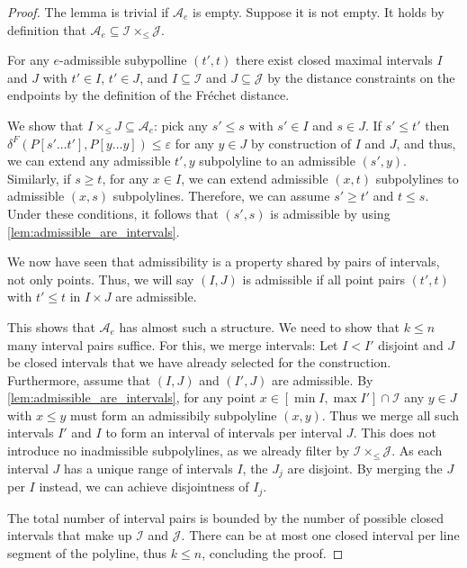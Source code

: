 \begin{proof}
	The lemma is trivial if \(\mathcal{A}_e\) is empty. Suppose it is not empty. It holds by definition that \(\mathcal{A}_e \subseteq \mathcal{I} \times_\leq \mathcal{J}\). 

	For any \(e\)-admissible subypolline \((t', t)\) there exist closed maximal intervals \(I\) and \(J\) with \(t' \in I\), \(t' \in J\), and \(I \subseteq \mathcal{I}\) and \(J \subseteq \mathcal{J}\) by the distance constraints on the endpoints by the definition of the Fréchet distance. 

	We show that \(I \times_\leq J \subseteq \mathcal{A}_e\): pick any \(s' \leq s\) with \(s' \in I\) and \(s \in J\). If \(s' \leq t'\) then \(\delta^F(P[s' \dots t'], P[y \dots y]) \leq \varepsilon\) for any \(y \in J\) by construction of \(I\) and \(J\), and thus, we can extend any admissible \(t', y\) subpolyline to an admissible \((s', y)\). Similarly, if \(s \geq t\), for any \(x \in I\), we can extend admissible \((x, t)\) subpolylines to admissible \((x, s)\) subpolylines. Therefore, we can assume \(s' \geq t'\) and \(t \leq s\). Under these conditions, it follows that \((s', s)\) is admissible by using \cref{lem:admissible_are_intervals}.

	We now have seen that admissibility is a property shared by pairs of intervals, not only points. Thus, we will say \((I, J)\) is admissible if all point pairs \((t', t)\) with \(t' \leq t\) in \(I \times J\) are admissible.


	This shows that \(\mathcal{A}_e\) has almost such a structure. We need to show that \(k \leq n\) many interval pairs suffice. For this, we merge intervals: Let \(I < I'\) disjoint and \(J\) be closed intervals that we have already selected for the construction. Furthermore, assume that \((I, J)\) and \((I', J)\) are admissible. By \cref{lem:admissible_are_intervals}, for any point \(x \in [\min I, \max I'] \cap \mathcal{I}\) any \(y \in J\) with \(x \leq y\) must form an admissibily subpolyline \((x, y)\). Thus we merge all such intervals \(I'\) and \(I\) to form an interval of intervals per interval \(J\). This does not introduce no inadmissible subpolylines, as we already filter by \(\mathcal{I} \times_\leq \mathcal{J}\). As each interval \(J\) has a unique range of intervals \(I\), the \(J_j\) are disjoint. By merging the \(J\) per \(I\) instead, we can achieve disjointness of \(I_j\).

	The total number of interval pairs is bounded by the number of possible closed intervals that make up \(\mathcal{I}\) and \(\mathcal{J}\). There can be at most one closed interval per line segment of the polyline, thus \(k \leq n\), concluding the proof.
\end{proof}


